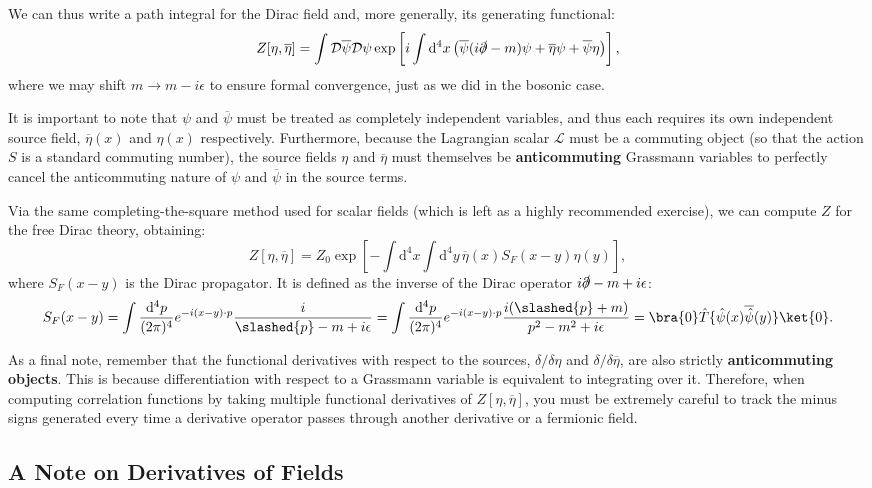 We can thus write a path integral for the Dirac field and, more generally, its generating functional:
\[
    Z[\eta, \overline{\eta}] = \int \mathcal{D} \overline{\psi} \mathcal{D} \psi \exp\left[i \int \mathrm{d}^4 x \left( \overline{\psi}(i \slashed{\partial} - m) \psi + \overline{\eta} \psi + \overline{\psi} \eta\right)\right],
\]
where we may shift \(m \to m-i\epsilon\) to ensure formal convergence, just as we did in the bosonic case.

It is important to note that \(\psi\) and \(\overline{\psi}\) must be treated as completely independent variables, and thus each requires its own independent source field, \(\overline{\eta}(x)\) and \(\eta(x)\) respectively. Furthermore, because the Lagrangian scalar \(\mathcal{L}\) must be a commuting object (so that the action \(S\) is a standard commuting number), the source fields \(\eta\) and \(\overline{\eta}\) must themselves be \textbf{anticommuting} Grassmann variables to perfectly cancel the anticommuting nature of \(\psi\) and \(\overline{\psi}\) in the source terms.

Via the same completing-the-square method used for scalar fields (which is left as a highly recommended exercise), we can compute \(Z\) for the free Dirac theory, obtaining:
\[
    Z[\eta, \overline{\eta}] = Z_0 \exp\left[-\int \mathrm{d}^4 x \int \mathrm{d}^4 y \, \overline{\eta}(x) S_F(x-y) \eta(y)\right],
\]
where \(S_F(x-y)\) is the Dirac propagator. It is defined as the inverse of the Dirac operator \(i \slashed{\partial} - m + i \epsilon\):
\[
    S_F(x-y) = \int \frac{\mathrm{d}^4 p}{(2\pi)^4} e^{-i (x-y)\cdot p} \frac{i}{\slashed{p} - m + i \epsilon} = \int \frac{\mathrm{d}^4 p}{(2\pi)^4} e^{-i (x-y)\cdot p} \frac{i (\slashed{p} + m)}{p^2 - m^2 + i \epsilon} = \bra{0} \hat{T} \{\hat{\psi}(x) \overline{\hat{\psi}}(y)\} \ket{0}.
\]

As a final note, remember that the functional derivatives with respect to the sources, \(\delta/\delta \eta\) and \(\delta/\delta \overline{\eta}\), are also strictly \textbf{anticommuting objects}. This is because differentiation with respect to a Grassmann variable is equivalent to integrating over it. Therefore, when computing correlation functions by taking multiple functional derivatives of \(Z[\eta, \overline{\eta}]\), you must be extremely careful to track the minus signs generated every time a derivative operator passes through another derivative or a fermionic field.

\subsection{A Note on Derivatives of Fields}

